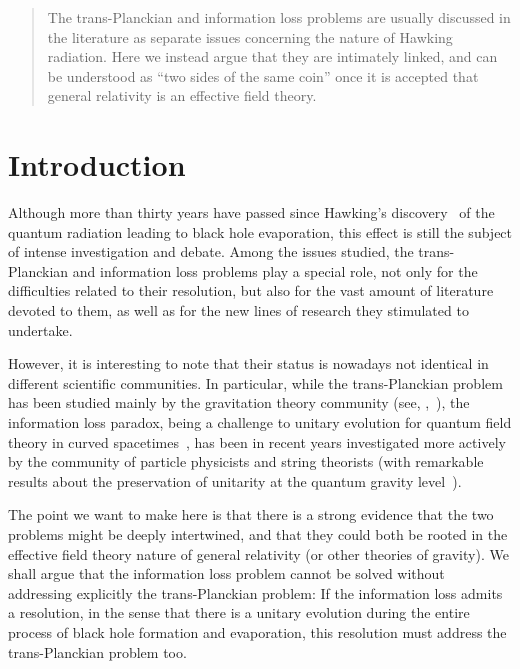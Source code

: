 \documentclass[12pt]{article}
\begin{document}
\begin{abstract}
\bigskip

The trans-Planckian and information loss problems are usually discussed in the literature as separate issues concerning the nature of Hawking radiation. Here we instead argue that they are intimately linked, and can be understood as ``two sides of the same coin'' once it is accepted that general relativity is an effective field theory. 

\end{abstract}

\newpage

\section{Introduction}
\label{sec:intro}

Although more than thirty years have passed since Hawking's discovery~\cite{Hawking:1974rv, Hawking:1974sw} of the quantum radiation leading to black hole evaporation, this effect is still the subject of intense investigation and debate. Among the issues studied, the trans-Planckian and information loss problems play a special role, not only for the difficulties related to their resolution, but also for the vast amount of literature devoted to them, as well as for the new lines of research they stimulated to undertake.

However, it is interesting to note that their status is nowadays not identical in different scientific communities.  In particular, while the trans-Planckian problem has been studied mainly by the gravitation theory community (see, \eg,~\cite{Unruh:1980cg,Unruh:1994je,Brout:1995wp,Corley:1996ar,Barrabes:1998iw,Parentani:1999qv,Barrabes:2000fr,Parentani:2000ts,Parentani:2007mb,Unruh:2004zk}), the information loss paradox, being a challenge to unitary evolution for quantum field theory in curved spacetimes~\cite{Hawking:1976ra, Hawking:1982dj}, has been in recent years investigated more actively by the community of particle physicists and string theorists (with remarkable results about the preservation of unitarity at the quantum gravity level~\cite{Stephens:1993an, 'tHooft:1996tq, Maldacena:2001kr}).

The point we want to make here is that there is a strong evidence that the two problems might be deeply intertwined, and that they could both be rooted in the effective field theory nature of general relativity (or other theories of gravity).  We shall argue that the information loss problem cannot be solved without addressing explicitly the trans-Planckian problem:  If the information loss admits a resolution, in the sense that there is a unitary evolution during the entire process of black hole formation and evaporation, this resolution must address the trans-Planckian problem too.
\end{document}
